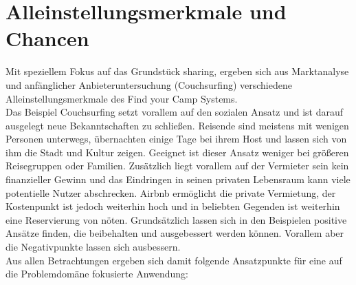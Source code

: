 

\section{Alleinstellungsmerkmale und Chancen}
Mit speziellem Fokus auf das Grundstück sharing, ergeben sich aus Marktanalyse und anfänglicher Anbieteruntersuchung (Couchsurfing) verschiedene Alleinstellungsmerkmale des Find your Camp Systems.\\

Das Beispiel Couchsurfing setzt vorallem auf den sozialen Ansatz und ist darauf ausgelegt neue Bekanntschaften zu schließen. Reisende sind meistens mit wenigen Personen unterwegs, übernachten einige Tage bei ihrem Host und lassen sich von ihm die Stadt und Kultur zeigen.
Geeignet ist dieser Ansatz weniger bei größeren Reisegruppen oder Familien. Zusätzlich liegt vorallem auf der Vermieter sein kein finanzieller Gewinn und das Eindringen in seinen privaten Lebensraum kann viele potentielle Nutzer abschrecken.
Airbnb ermöglicht die private Vermietung, der Kostenpunkt ist jedoch weiterhin hoch und in beliebten Gegenden ist weiterhin eine Reservierung von nöten. 
Grundsätzlich lassen sich in den Beispielen positive Ansätze finden, die beibehalten und ausgebessert werden können. Vorallem aber die Negativpunkte lassen sich ausbessern.\\ Aus allen Betrachtungen ergeben sich damit folgende Ansatzpunkte für eine auf die Problemdomäne fokusierte Anwendung:\\


